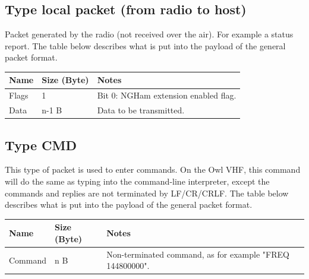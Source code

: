 \documentclass[a4paper, english, 12pt, hidelinks]{article}
\begin{document}
    \subsection{Type local packet (from radio to host)}
        Packet generated by the radio (not received over the air). For example a status report. The table below describes what is 
        put into the payload of the general packet format.
		\begin{table}[H]
			\centering
			\begin{tabular}{|p{3cm}|p{2cm}|p{10cm}|}
				\hline
				Name & Size (Byte) & Notes \\
				\hline
                Flags & 1 & Bit 0: NGHam extension enabled flag. \\
                Data & n-1 B & Data to be transmitted. \\
				\hline
			\end{tabular}
		\end{table}

    \subsection{Type CMD}
        This type of packet is used to enter commands. On the Owl VHF, this command will do the same as 
        typing into the command-line interpreter, except the commands and replies are not terminated by LF/CR/CRLF. 
        The table below describes what is put into the payload of the general packet format.
		\begin{table}[H]
			\centering
			\begin{tabular}{|p{3cm}|p{2cm}|p{10cm}|}
				\hline
				Name & Size (Byte) & Notes \\
				\hline
                Command & n B & Non-terminated command, as for example "FREQ 144800000". \\
				\hline
			\end{tabular}
		\end{table}
\end{document}
